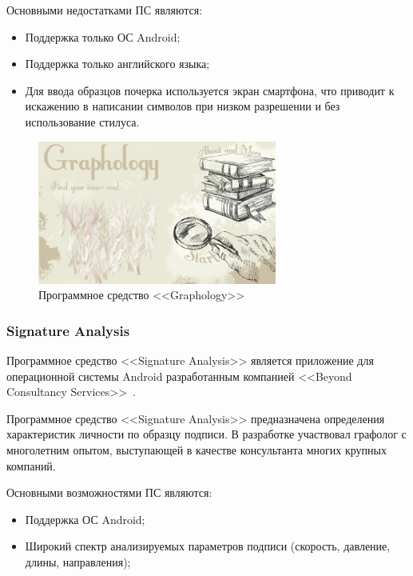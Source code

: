 Основными недостатками ПС являются:
\begin{itemize}
  \item Поддержка только ОС Android;
  \item Поддержка только английского языка;
  \item Для ввода образцов почерка используется экран смартфона, что приводит к искажению в написании символов при низком разрешении и без использование стилуса.
\end{itemize}

\begin{figure}[ht]
    \centering
    \label{fig:domain:analogs:graphology}
    \includegraphics[width=0.7\textwidth]{figures/graphology_analog.jpeg}
    \caption{Программное средство <<Graphology>>}
\end{figure}

\subsubsection{Signature Analysis}
\label{sub:domain:analogs:signature_analysis} 

Программное средство <<Signature Analysis>> является приложение для операционной системы Android разработанным компанией <<Beyond Consultancy Services>>~\cite{analogs_signature_analysis}.

Программное средство <<Signature Analysis>> предназначена определения характеристик личности по образцу подписи. В разработке участвовал графолог с многолетним опытом, выступающей в качестве консультанта многих крупных компаний.

Основными возможностями ПС являются:
\begin{itemize}
  \item Поддержка ОС Android;
  \item Широкий спектр анализируемых параметров подписи (скорость, давление, длины, направления);
\end{itemize}

